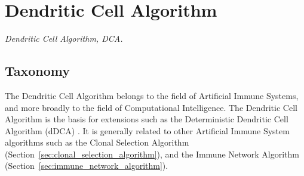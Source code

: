 

\section{Dendritic Cell Algorithm} 
\label{sec:dca}

\emph{Dendritic Cell Algorithm, DCA.}

\subsection{Taxonomy}
The Dendritic Cell Algorithm belongs to the field of Artificial Immune Systems, and more broadly to the field of Computational Intelligence.
The Dendritic Cell Algorithm is the basis for extensions such as the Deterministic Dendritic Cell Algorithm (dDCA) \cite{Greensmith2008}.
It is generally related to other Artificial Immune System algorithms such as the Clonal Selection Algorithm (Section~\ref{sec:clonal_selection_algorithm}), and the Immune Network Algorithm (Section~\ref{sec:immune_network_algorithm}).

